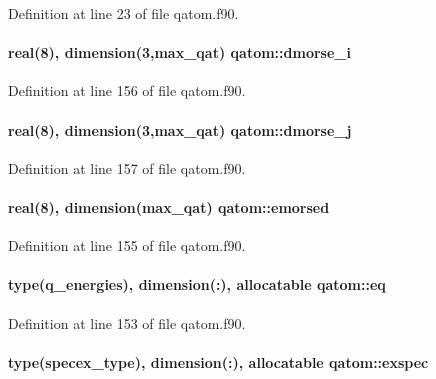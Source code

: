 Definition at line 23 of file qatom.\-f90.

\hypertarget{classqatom_a3424db0cbb148216b22871cc6c1e054b}{
\paragraph[{dmorse\-\_\-i}]{\setlength{\rightskip}{0pt plus 5cm}real(8), dimension(3,{\bf max\-\_\-qat}) qatom\-::dmorse\-\_\-i}}\label{classqatom_a3424db0cbb148216b22871cc6c1e054b}


Definition at line 156 of file qatom.\-f90.

\hypertarget{classqatom_a0cb9138f02b1243e97d04dc9c55d195f}{
\paragraph[{dmorse\-\_\-j}]{\setlength{\rightskip}{0pt plus 5cm}real(8), dimension(3,{\bf max\-\_\-qat}) qatom\-::dmorse\-\_\-j}}\label{classqatom_a0cb9138f02b1243e97d04dc9c55d195f}


Definition at line 157 of file qatom.\-f90.

\hypertarget{classqatom_a27e9080641bfc27dddb1925910a424f7}{
\paragraph[{emorsed}]{\setlength{\rightskip}{0pt plus 5cm}real(8), dimension({\bf max\-\_\-qat}) qatom\-::emorsed}}\label{classqatom_a27e9080641bfc27dddb1925910a424f7}


Definition at line 155 of file qatom.\-f90.

\hypertarget{classqatom_a1460f80a9398e8412e72c0f510d5af4d}{
\paragraph[{eq}]{\setlength{\rightskip}{0pt plus 5cm}type(q\-\_\-energies), dimension(\-:), allocatable qatom\-::eq}}\label{classqatom_a1460f80a9398e8412e72c0f510d5af4d}


Definition at line 153 of file qatom.\-f90.

\hypertarget{classqatom_a8056cd41f167e8804510eb741ab0228d}{
\paragraph[{exspec}]{\setlength{\rightskip}{0pt plus 5cm}type({\bf specex\-\_\-type}), dimension(\-:), allocatable qatom\-::exspec}}\label{classqatom_a8056cd41f167e8804510eb741ab0228d}


